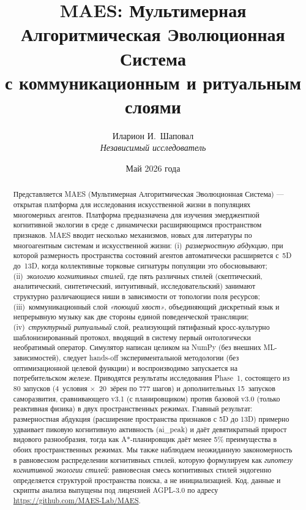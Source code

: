 \documentclass[11pt,a4paper]{article}
\title{MAES: Мультимерная Алгоритмическая Эволюционная Система\\
       с коммуникационным и ритуальным слоями}
\author{Иларион И.~Шаповал\\
        \small\textit{Независимый исследователь}}
\date{Май 2026 года}
\begin{document}
\maketitle

\begin{abstract}
Представляется MAES (Мультимерная Алгоритмическая Эволюционная Система) ---
открытая платформа для исследования искусственной жизни в популяциях
многомерных агентов. Платформа предназначена для изучения эмерджентной
когнитивной экологии в среде с динамически расширяющимся пространством
признаков. MAES вводит несколько механизмов, новых для литературы по
многоагентным системам и искусственной жизни: (i)~\emph{размерностную
абдукцию}, при которой размерность пространства состояний агентов
автоматически расширяется с~5D до~13D, когда коллективные торковые сигнатуры
популяции это обосновывают; (ii)~\emph{экологию когнитивных стилей}, где
пять различных стилей (скептический, аналитический, синтетический,
интуитивный, исследовательский) занимают структурно различающиеся ниши в
зависимости от топологии поля ресурсов; (iii)~коммуникационный слой
\emph{«поющий хвост»}, объединяющий дискретный язык и непрерывную музыку
как две стороны единой поведенческой трансляции; (iv)~\emph{структурный
ритуальный} слой, реализующий пятифазный кросс-культурно
шаблонизированный протокол, вводящий в систему первый онтологически
необратимый оператор. Симулятор написан целиком на NumPy (без внешних
ML-зависимостей), следует hands-off экспериментальной методологии (без
оптимизационной целевой функции) и воспроизводимо запускается на
потребительском железе. Приводятся результаты исследования Phase~1,
состоящего из 80 запусков (4~условия $\times$~20~зёрен по 777 шагов)
и дополнительных 15~запусков саморазвития, сравнивающего v3.1 (с
планировщиком) против базовой v3.0 (только реактивная физика) в
двух пространственных режимах. Главный результат: размерностная
абдукция (расширение пространства признаков с 5D до 13D) примерно
удваивает пиковую когнитивную активность (ai\_peak) и даёт
девятикратный прирост видового разнообразия, тогда как A*-планировщик
даёт менее 5\% преимущества в обоих пространственных режимах. Мы
также наблюдаем неожиданную закономерность в равновесном распределении
когнитивных стилей, которую формулируем как \emph{гипотезу когнитивной
экологии стилей}: равновесная смесь когнитивных стилей эндогенно
определяется структурой пространства поиска, а не инициализацией.
Код, данные и скрипты анализа выпущены под лицензией AGPL-3.0 по адресу
\url{https://github.com/MAES-Lab/MAES}.
\end{abstract}
\end{document}
